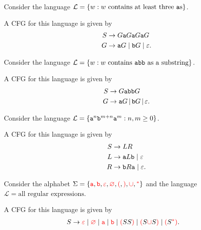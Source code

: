 \documentclass{notes}
\begin{document}
\begin{eg}
  Consider the language $\mathcal L = \left \{ w : \text{$w$ contains at least three \verb~a~s} \right \}$.

  A CFG for this language is given by 
  \begin{align*}
    S &\to G \verb~a~ G \verb~a~ G \verb~a~ G \\ 
    G &\to  \verb~a~ G \; | \; \verb~b~ G \; | \; \varepsilon.
  \end{align*}
\end{eg}

\begin{eg}
  Consider the language $\mathcal L = \left \{ w : \text{$w$ contains \verb~abb~ as a substring} \right \}$.
  
  A CFG for this language is given by 
  \begin{align*}
    S &\to G \verb~abb~ G \\ 
    G &\to \verb~a~ G \, | \, \verb~b~ G \, | \, \varepsilon.
  \end{align*}
\end{eg}

\begin{eg}
  Consider the language $\mathcal L = \left \{ \verb~a~^n \verb~b~^{m + n} \verb~a~^m : n, m \geq 0 \right \}$.
  
  A CFG for this language is given by 
  \begin{align*}
    S &\to L R \\ 
    L &\to \verb~a~ L \verb~b~ \; | \; \varepsilon \\ 
    R &\to \verb~b~ R \verb~a~ \; | \; \varepsilon.
  \end{align*}
\end{eg}

\begin{eg}
  Consider the alphabet $\Sigma = \left \{ {\color{red} \verb~a~}, {\color{red} \verb~b~}, {\color{red} \varepsilon}, {\color{red} \varnothing}, {\color{red} (}, {\color{red} )}, {\color{red} \cup}, {\color{red} {}^*} \right \}$ and the language $\mathcal L = \text{all regular expressions}$.

  A CFG for this language is given by 
  \begin{align*}
    S &\to {\color{red} \varepsilon} \; | \; {\color{red} \varnothing} \; | \; {\color{red} \verb~a~} \; | \; {\color{red} \verb~b~} \; | \; {\color{red} (} S S {\color{red} )} \; | \; {\color{red} (} S {\color{red} \cup} S {\color{red} )} \; | \; {\color{red} (} S {\color{red} {}^*} {\color{red} )}.
  \end{align*}
\end{eg}
\end{document}
